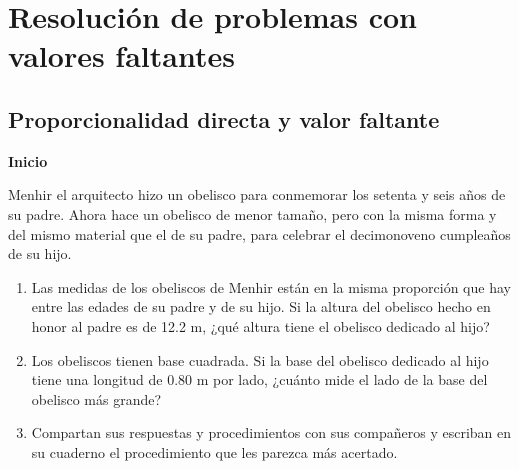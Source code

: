 \thispagestyle{plain}
\section{Resolución de problemas con valores faltantes}

\subsection{Proporcionalidad directa y valor faltante}
\begin{boxK}
    \begin{center}\textbf{Inicio}\end{center}
    Menhir el arquitecto hizo un obelisco para conmemorar los setenta y seis años de su padre.
    Ahora hace un obelisco de menor tamaño, pero con la misma forma y del mismo material
    que el de su padre, para celebrar el decimonoveno cumpleaños de su hijo.
    \begin{enumerate}
        \item Las medidas de los obeliscos de Menhir están en la misma proporción que hay entre las
              edades de su padre y de su hijo. Si la altura del obelisco hecho en honor al padre es de
              12.2 m, ¿qué altura tiene el obelisco dedicado al hijo?

        \item Los obeliscos tienen base cuadrada. Si la base del obelisco dedicado al hijo tiene una
              longitud de 0.80 m por lado, ¿cuánto mide el lado de la base del obelisco más grande?
        \item Compartan sus respuestas y procedimientos con sus compañeros y escriban en su cuaderno
              el procedimiento que les parezca más acertado.
    \end{enumerate}
\end{boxK}


